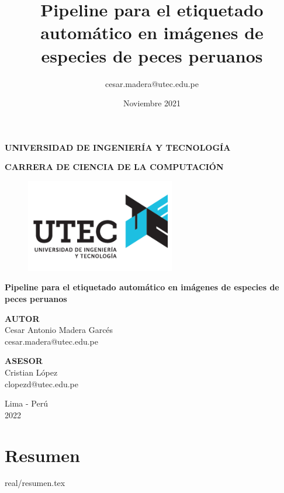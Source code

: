 \documentclass{report}
\title{Pipeline para el etiquetado 
automático en imágenes de especies 
de peces peruanos}
\author{cesar.madera@utec.edu.pe}
\date{Noviembre 2021}
\begin{document}
\begin{titlepage}
    \begin{center}
        \Large
        \textbf{UNIVERSIDAD DE INGENIERÍA Y TECNOLOGÍA}
        \vspace*{1cm}

        \large
        \textbf{CARRERA DE CIENCIA DE LA COMPUTACIÓN}
        \vspace*{1cm}

        \begin{figure}[htbp]
            \centering
            \includegraphics[width=6.5cm,height=\textheight,keepaspectratio]{images/logo}
        \end{figure}


        \LARGE
        \textbf{Pipeline para el etiquetado 
            automático en imágenes de especies 
            de peces peruanos}

        \vspace{1.0cm}
        \Large


        \textbf{AUTOR}
        \vspace{0.5cm}
        \\Cesar Antonio Madera Garcés
        \\cesar.madera@utec.edu.pe

        \textbf{ASESOR}
        \vspace{0.5cm}
        \\Cristian López
        \\clopezd@utec.edu.pe
        \vfill
        \Large

        Lima - Perú
        \\
        2022

    \end{center}
\end{titlepage}


\chapter*{Resumen}
{real/resumen.tex}
\end{document}
